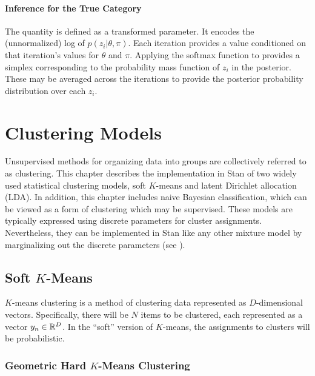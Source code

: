 \subsubsection{Inference for the True Category}

The quantity  is defined as a transformed
parameter.  It encodes the (unnormalized) log of $p(z_i | \theta,
\pi)$.  Each iteration provides a value conditioned on that
iteration's values for $\theta$ and $\pi$.  Applying the softmax
function to  provides a simplex corresponding to
the probability mass function of $z_i$ in the posterior.   These may
be averaged across the iterations to provide the posterior probability
distribution over each $z_i$.


\chapter{Clustering Models}\label{clustering.chapter}

\noindent
Unsupervised methods for organizing data into groups are collectively
referred to as clustering.  This chapter describes the implementation
in Stan of two widely used statistical clustering models, soft
$K$-means and latent Dirichlet allocation (LDA).  In addition, this
chapter includes naive Bayesian classification, which can be viewed as
a form of clustering which may be supervised.  These models are
typically expressed using discrete parameters for cluster assignments.
Nevertheless, they can be implemented in Stan like any other mixture
model by marginalizing out the discrete parameters (see
).

\section{Soft $K$-Means}

$K$-means clustering is a method of clustering data represented as
$D$-dimensional vectors.  Specifically, there will be $N$ items to be
clustered, each represented as a vector $y_n \in \mathbb{R}^D$.  In the
``soft'' version of $K$-means, the assignments to clusters will be
probabilistic.  

\subsection{Geometric Hard  $K$-Means Clustering}

